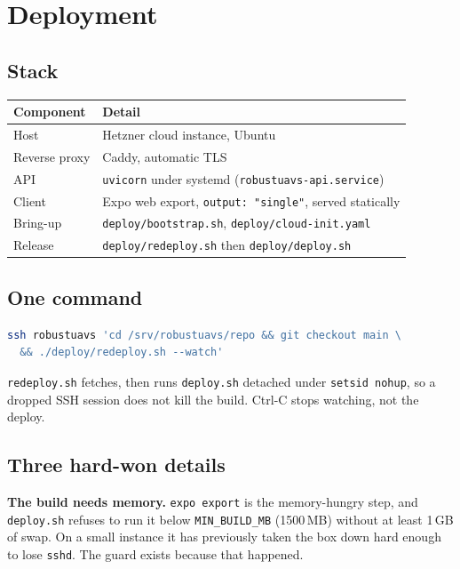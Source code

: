 \documentclass[11pt,a4paper]{article}
\newcommand{\code}[1]{\texttt{#1}}
\begin{document}
\section{Deployment}

\subsection{Stack}
\begin{table}[H]
\centering\small
\begin{tabularx}{\linewidth}{@{}p{3.4cm}X@{}}
\toprule
\textbf{Component} & \textbf{Detail} \\
\midrule
Host & Hetzner cloud instance, Ubuntu \\
Reverse proxy & Caddy, automatic TLS \\
API & \code{uvicorn} under systemd (\code{robustuavs-api.service}) \\
Client & Expo web export, \code{output: "single"}, served statically \\
Bring-up & \code{deploy/bootstrap.sh}, \code{deploy/cloud-init.yaml} \\
Release & \code{deploy/redeploy.sh} then \code{deploy/deploy.sh} \\
\bottomrule
\end{tabularx}
\end{table}

\subsection{One command}
\begin{lstlisting}[language=bash]
ssh robustuavs 'cd /srv/robustuavs/repo && git checkout main \
  && ./deploy/redeploy.sh --watch'
\end{lstlisting}

\code{redeploy.sh} fetches, then runs \code{deploy.sh} detached under
\code{setsid nohup}, so a dropped SSH session does not kill the build.
Ctrl-C stops watching, not the deploy.

\subsection{Three hard-won details}
\textbf{The build needs memory.} \code{expo export} is the memory-hungry step,
and \code{deploy.sh} refuses to run it below \code{MIN\_BUILD\_MB} (1500\,MB)
without at least 1\,GB of swap. On a small instance it has previously taken the
box down hard enough to lose \code{sshd}. The guard exists because that happened.
\end{document}
